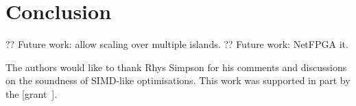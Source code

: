 \documentclass[sigconf,natbib=false]{acmart}
\begin{document}
\section{Conclusion}

?? Future work: allow scaling over multiple islands.
?? Future work: NetFPGA it.

\begin{acks}
	The authors would like to thank Rhys Simpson for his comments and discussions on the soundness of SIMD-like optimisations.
	This work was supported in part by the  [grant~].
\end{acks}
	
%
%
\printbibliography
\end{document}
